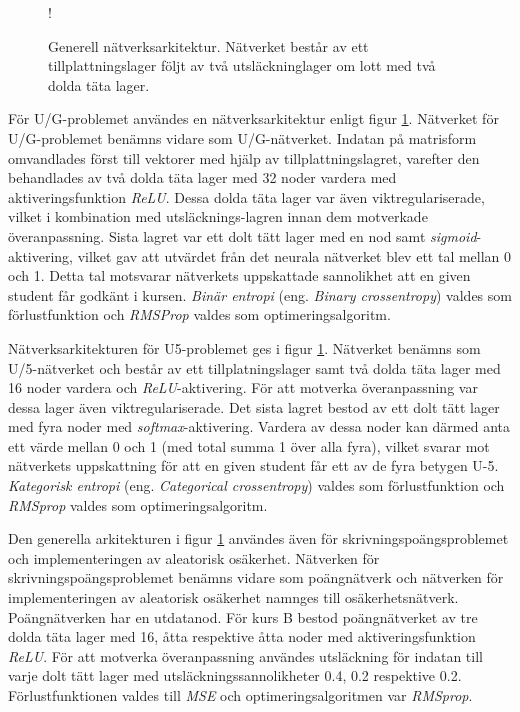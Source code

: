 \begin{figure}[hbtp]
    \centering
    \resizebox {\textwidth} {!} {
        
    }
    \caption{Generell nätverksarkitektur. Nätverket består av ett tillplattningslager följt av två utsläckninglager om lott med två dolda täta lager.}
    \label{fig:general_nn_app}
\end{figure}

För U/G-problemet användes en nätverksarkitektur enligt figur \ref{fig:general_nn_app}. Nätverket för U/G-problemet benämns vidare som U/G-nätverket. Indatan på matrisform omvandlades först till vektorer med hjälp av tillplattningslagret, varefter den behandlades av två dolda täta lager med 32 noder vardera med aktiveringsfunktion \emph{ReLU}. Dessa dolda täta lager var även viktregulariserade, vilket i kombination med utsläcknings-lagren innan dem motverkade överanpassning. Sista lagret var ett dolt tätt lager med en nod samt \emph{sigmoid}-aktivering, vilket gav att utvärdet från det neurala nätverket blev ett tal mellan 0 och 1. Detta tal motsvarar nätverkets uppskattade sannolikhet att en given student får godkänt i kursen. \emph{Binär entropi }(eng. \emph{Binary crossentropy}) valdes som förlustfunktion och \emph{RMSProp} valdes som optimeringsalgoritm. 

Nätverksarkitekturen för U5-problemet ges i figur \ref{fig:general_nn_app}. Nätverket benämns som U/5-nätverket och består av ett tillplatningslager samt två dolda täta lager med 16 noder vardera och \emph{ReLU}-aktivering. För att motverka överanpassning var dessa lager även viktregulariserade. Det sista lagret bestod av ett dolt tätt lager med fyra noder med \emph{softmax}-aktivering. Vardera av dessa noder kan därmed anta ett värde mellan 0 och 1 (med total summa 1 över alla fyra), vilket svarar mot nätverkets uppskattning för att en given student får ett av de fyra betygen U-5. \emph{Kategorisk entropi} (eng. \emph{Categorical crossentropy}) valdes som förlustfunktion och \emph{RMSprop} valdes som optimeringsalgoritm. 

Den generella arkitekturen i figur \ref{fig:general_nn_app} användes även för skrivningspoängsproblemet och implementeringen av aleatorisk osäkerhet. Nätverken för skrivningspoängsproblemet benämns vidare som poängnätverk och nätverken för implementeringen av aleatorisk osäkerhet namnges till osäkerhetsnätverk. Poängnätverken har en utdatanod. För kurs B bestod poängnätverket av tre dolda täta lager med 16, åtta respektive åtta noder med aktiveringsfunktion \emph{ReLU}. För att motverka överanpassning användes utsläckning för indatan till varje dolt tätt lager med utsläckningssannolikheter 0.4, 0.2 respektive 0.2. Förlustfunktionen valdes till \emph{MSE} och optimeringsalgoritmen var \emph{RMSprop}.

